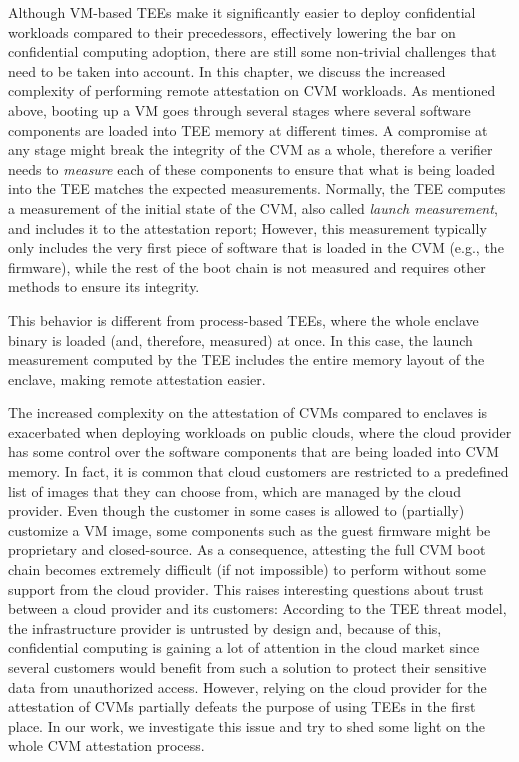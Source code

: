 Although \acs{VM}-based \acsp{TEE} make it significantly easier to deploy
confidential workloads compared to their precedessors, effectively lowering the
bar on confidential computing adoption, there are still some non-trivial
challenges that need to be taken into account. In this chapter, we discuss the
increased complexity of performing remote attestation on \acs{CVM} workloads. As
mentioned above, booting up a \acs{VM} goes through several stages where several
software components are loaded into \acs{TEE} memory at different times. A
compromise at any stage might break the integrity of the \acs{CVM} as a whole,
therefore a verifier needs to \emph{measure} each of these components to ensure
that what is being loaded into the \acs{TEE} matches the expected measurements.
Normally, the \acs{TEE} computes a measurement of the initial state of the
\acs{CVM}, also called \emph{launch measurement}, and includes it to the
attestation report; However, this measurement typically only includes the very
first piece of software that is loaded in the \acs{CVM} (e.g., the firmware),
while the rest of the boot chain is not measured and requires other methods to
ensure its integrity.
%

%
This behavior is different from process-based \acsp{TEE}, where the whole
enclave binary is loaded (and, therefore, measured) at once. In this case, the
launch measurement computed by the \acs{TEE} includes the entire memory layout
of the enclave, making remote attestation easier.

The increased complexity on the attestation of \acp{CVM} compared to enclaves is
exacerbated when deploying workloads on public clouds, where the cloud provider
has some control over the software components that are being loaded into
\ac{CVM} memory. In fact, it is common that cloud customers are restricted to a
predefined list of images that they can choose from, which are managed by the
cloud provider. Even though the customer in some cases is allowed to (partially)
customize a \acs{VM} image, some components such as the guest firmware might be
proprietary and closed-source. As a consequence, attesting the full \ac{CVM}
boot chain becomes extremely difficult (if not impossible) to perform without
some support from the cloud provider. This raises interesting questions about
trust between a cloud provider and its customers: According to the \acs{TEE}
threat model, the infrastructure provider is untrusted by design and, because of
this, confidential computing is gaining a lot of attention in the cloud market
since several customers would benefit from such a solution to protect their
sensitive data from unauthorized access. However, relying on the cloud provider
for the attestation of \acp{CVM} partially defeats the purpose of using
\acsp{TEE} in the first place. In our work, we investigate this issue and try to
shed some light on the whole \ac{CVM} attestation process.

